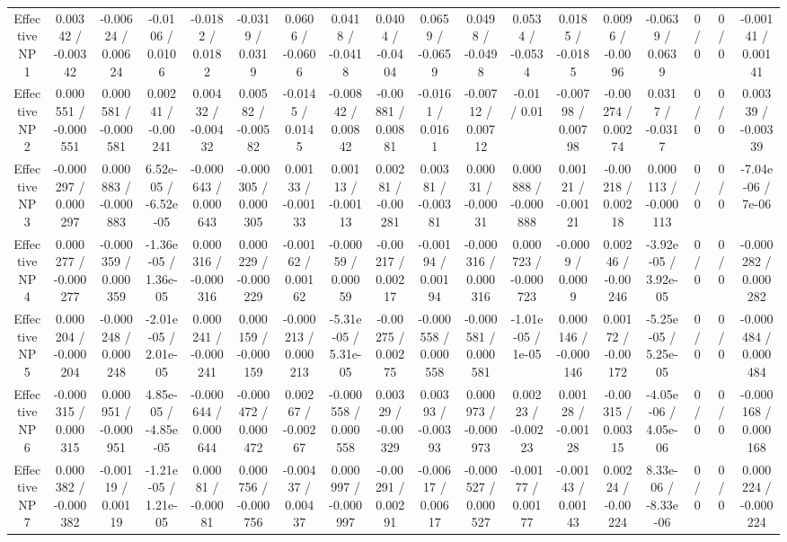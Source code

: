 \documentclass[10pt]{article}
\begin{document}
\begin{table}[htbp]
\begin{center}
\begin{tabular}{|c|c|c|c|c|c|c|c|c|c|c|c|c|c|c|c|c|c|}
  Effective NP 1 & 0.00342 / -0.00342 & -0.00624 / 0.00624 & -0.0106 / 0.0106 & -0.0182 / 0.0182 & -0.0319 / 0.0319 & 0.0606 / -0.0606 & 0.0418 / -0.0418 & 0.0404 / -0.0404 & 0.0659 / -0.0659 & 0.0498 / -0.0498 & 0.0534 / -0.0534 & 0.0185 / -0.0185 & 0.0096 / -0.0096 & -0.0639 / 0.0639 & 0 / 0 & 0 / 0 & -0.00141 / 0.00141 \\ 
  Effective NP 2 & 0.000551 / -0.000551 & 0.000581 / -0.000581 & 0.00241 / -0.00241 & 0.00432 / -0.00432 & 0.00582 / -0.00582 & -0.0145 / 0.0145 & -0.00842 / 0.00842 & -0.00881 / 0.00881 & -0.0161 / 0.0161 & -0.00712 / 0.00712 & -0.01 / 0.01 & -0.00798 / 0.00798 & -0.00274 / 0.00274 & 0.0317 / -0.0317 & 0 / 0 & 0 / 0 & 0.00339 / -0.00339 \\ 
  Effective NP 3 & -0.000297 / 0.000297 & 0.000883 / -0.000883 & 6.52e-05 / -6.52e-05 & -0.000643 / 0.000643 & -0.000305 / 0.000305 & 0.00133 / -0.00133 & 0.00113 / -0.00113 & 0.00281 / -0.00281 & 0.00381 / -0.00381 & 0.00031 / -0.00031 & 0.000888 / -0.000888 & 0.00121 / -0.00121 & -0.00218 / 0.00218 & 0.000113 / -0.000113 & 0 / 0 & 0 / 0 & -7.04e-06 / 7e-06 \\ 
  Effective NP 4 & 0.000277 / -0.000277 & -0.000359 / 0.000359 & -1.36e-05 / 1.36e-05 & 0.000316 / -0.000316 & 0.000229 / -0.000229 & -0.00162 / 0.00162 & -0.00059 / 0.00059 & -0.00217 / 0.00217 & -0.00194 / 0.00194 & -0.000316 / 0.000316 & 0.000723 / -0.000723 & -0.0009 / 0.0009 & 0.00246 / -0.00246 & -3.92e-05 / 3.92e-05 & 0 / 0 & 0 / 0 & -0.000282 / 0.000282 \\ 
  Effective NP 5 & 0.000204 / -0.000204 & -0.000248 / 0.000248 & -2.01e-05 / 2.01e-05 & 0.000241 / -0.000241 & 0.000159 / -0.000159 & -0.000213 / 0.000213 & -5.31e-05 / 5.31e-05 & -0.00275 / 0.00275 & -0.000558 / 0.000558 & -0.000581 / 0.000581 & -1.01e-05 / 1e-05 & 0.000146 / -0.000146 & 0.00172 / -0.00172 & -5.25e-05 / 5.25e-05 & 0 / 0 & 0 / 0 & -0.000484 / 0.000484 \\ 
  Effective NP 6 & -0.000315 / 0.000315 & 0.000951 / -0.000951 & 4.85e-05 / -4.85e-05 & -0.000644 / 0.000644 & -0.000472 / 0.000472 & 0.00267 / -0.00267 & -0.000558 / 0.000558 & 0.00329 / -0.00329 & 0.00393 / -0.00393 & 0.000973 / -0.000973 & 0.00223 / -0.00223 & 0.00128 / -0.00128 & -0.00315 / 0.00315 & -4.05e-06 / 4.05e-06 & 0 / 0 & 0 / 0 & -0.000168 / 0.000168 \\ 
  Effective NP 7 & 0.000382 / -0.000382 & -0.00119 / 0.00119 & -1.21e-05 / 1.21e-05 & 0.00081 / -0.00081 & 0.000756 / -0.000756 & -0.00437 / 0.00437 & 0.000997 / -0.000997 & -0.00291 / 0.00291 & -0.00617 / 0.00617 & -0.000527 / 0.000527 & -0.00177 / 0.00177 & -0.00143 / 0.00143 & 0.00224 / -0.00224 & 8.33e-06 / -8.33e-06 & 0 / 0 & 0 / 0 & 0.000224 / -0.000224 \\ 

\end{tabular}
\end{center}
\end{table}
\end{document}
